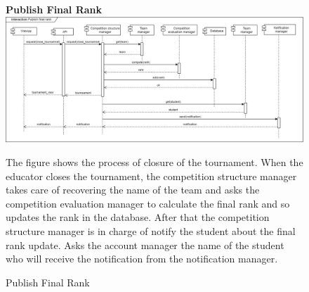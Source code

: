 \begin{enumerate}[label=\textbf{[UC\arabic*]}]
    \begin{figure}
    \item \textbf{Publish Final Rank}
        \centering
        \includegraphics[width= \textwidth]{Images/Publish_Final_Rank.jpg}
        \caption{Publish Final Rank}
        \label{fig:enter-label}
        \raggedright The figure shows the process of closure of the tournament. When the educator closes the tournament, the competition structure manager takes care of recovering the name of the team and asks the competition evaluation manager to calculate the final rank and so updates the rank in the database.
        After that the competition structure manager is in charge of notify the student about the final rank update. Asks the account manager the name of the student who will receive the notification from the notification manager.
    \end{figure}


\end{enumerate}
